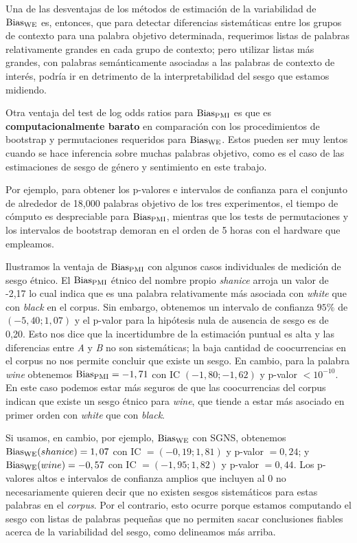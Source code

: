 
Una de las desventajas de los métodos de estimación de la variabilidad de $\operatorname{Bias_{WE}}$ es, entonces, que para detectar diferencias sistemáticas entre los grupos de contexto para una palabra objetivo determinada, requerimos listas de palabras relativamente grandes en cada grupo de contexto; pero utilizar listas más grandes, con palabras semánticamente asociadas a las palabras de contexto de interés, podría ir en detrimento de la interpretabilidad del sesgo que estamos midiendo. 

Otra ventaja del test de log odds ratios para $\operatorname{Bias_{PMI}}$ es que es \textbf{computacionalmente barato} en comparación con los procedimientos de bootstrap y permutaciones requeridos para $\operatorname{Bias_{WE}}$. Estos pueden ser muy lentos cuando se hace inferencia sobre muchas palabras objetivo, como es el caso de las estimaciones de sesgo de género y sentimiento en este trabajo.


Por ejemplo, para obtener los p-valores e intervalos de confianza para el conjunto de alrededor de 18,000 palabras objetivo de los tres experimentos, el tiempo de cómputo es despreciable para $\operatorname{Bias_{PMI}}$, mientras que los tests de permutaciones y los intervalos de bootstrap demoran en el orden de 5 horas con el hardware que empleamos. 

Ilustramos la ventaja de $\operatorname{Bias_{PMI}}$ con algunos casos individuales de medición de sesgo étnico. El $\operatorname{Bias_{PMI}}$ étnico del nombre propio \emph{shanice} arroja un valor de -2,17 lo cual indica que es una palabra relativamente más asociada con \emph{white} que con \emph{black} en el corpus. Sin embargo, obtenemos un intervalo de confianza $95\%$ de $(-5,40; 1,07)$ y el p-valor para la hipótesis nula de ausencia de sesgo es de 0,20. Esto nos dice que la incertidumbre de la estimación puntual es alta y las diferencias entre \emph{A} y \emph{B} no son sistemáticas; la baja cantidad de coocurrencias en el corpus no nos permite concluir que existe un sesgo. En cambio, para la palabra \emph{wine} obtenemos $\operatorname{Bias_{PMI}} = -1,71$ con IC $(-1,80; -1,62)$ y p-valor $< 10^{-10}$. En este caso podemos estar más seguros de que las coocurrencias del corpus indican que existe un sesgo étnico para \emph{wine}, que tiende a estar más asociado en primer orden con \emph{white} que con \emph{black}. 


Si usamos, en cambio, por ejemplo, $\operatorname{Bias_{WE}}$ con SGNS, obtenemos \, $\operatorname{Bias_{WE}}(shanice) = 1,07$ con IC $=(-0,19; 1,81)$ y p-valor $= 0,24$; y $\operatorname{Bias_{WE}}(wine) = -0,57$ con IC $=(-1,95; 1,82)$ y p-valor $= 0,44$. Los p-valores altos e intervalos de confianza amplios que incluyen al 0 no necesariamente quieren decir que no existen sesgos sistemáticos para estas palabras en el \emph{corpus}. Por el contrario, esto ocurre porque estamos computando el sesgo con listas de palabras pequeñas que no permiten sacar conclusiones fiables acerca de la variabilidad del sesgo, como delineamos más arriba. 

